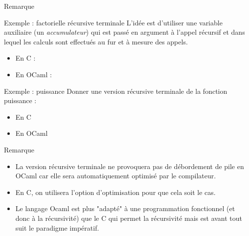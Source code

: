 \documentclass[10pt]{beamer}
\begin{document}
\begin{frame}[fragile]{\Ctitle}{\stitle}
\begin{block}{Remarque}
	\end{block}

\end{frame}

\begin{frame}{\Ctitle}{\stitle}
	\begin{exampleblock}{Exemple :  factorielle récursive terminale}
		L'idée est d'utiliser une variable auxiliaire (un \textit{accumulateur}) qui est passé en argument à l'appel récursif et dans lequel les calculs sont effectués au fur et à mesure des appels.
		\begin{itemize}
			\item<2->En C :
			\onslide<2->
			\item<2->En OCaml :
			\onslide<2->
		\end{itemize}
	\end{exampleblock}
\end{frame}

\begin{frame}{\Ctitle}{\stitle}
	\begin{exampleblock}{Exemple :  puissance}
		Donner une version récursive terminale de la fonction puissance :
		\begin{itemize}
			\item<2-> En C
				\onslide<3->
			\item<4-> En OCaml
				\onslide<4->
		\end{itemize}
	\end{exampleblock}
\end{frame}

\begin{frame}{\Ctitle}{\stitle}
	\begin{block}{Remarque}
		\begin{itemize}
			\item<1-> La version récursive terminale ne provoquera pas de débordement de pile en OCaml car elle sera automatiquement optimisé par le compilateur.
			\item<2-> En C, on utilisera l'option d'optimisation  pour que cela soit le cas.
			\item<3-> Le langage Ocaml est plus "adapté" à une programmation fonctionnel (et donc à la récursivité) que le C qui permet la récursivité mais est avant tout suit le paradigme impératif.
		\end{itemize}
	\end{block}
\end{frame}
\end{document}

